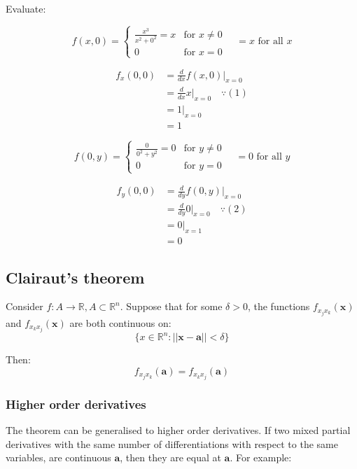 \documentclass[11pt]{article}
\begin{document}
Evaluate:

\[
f(x, 0) = \begin{cases}
\frac{x^3}{x^2 + 0^2} = x & \text{for } x \ne 0 \\
0 & \text{for } x = 0
\end{cases}
\quad = x \text{ for all } x \tag{1}
\]

\begin{align*}
f_x(0, 0) &= \frac{d}{dx} f(x, 0)|_{x = 0} \\
&= \frac{d}{dx}x|_{x = 0} \quad \because (1) \\
&= 1|_{x = 0} \\
&= 1
\end{align*}

\[
f(0, y) = \begin{cases}
\frac{0}{0^2 + y^2} = 0 & \text{for } y \ne 0 \\
0 & \text{for } y = 0
\end{cases}
\quad = 0 \text{ for all } y \tag{2}
\]

\begin{align*}
f_y(0, 0) &= \frac{d}{dy} f(0, y)|_{x = 0} \\
&= \frac{d}{dy}0|_{x = 0} \quad \because (2) \\
&= 0|_{x = 1} \\
&= 0
\end{align*}

\subsection{Clairaut's theorem}
\label{sec:org06ac5bc}
Consider \(f : A \rightarrow \mathbb{R}, A \subset \mathbb{R}^n\). Suppose that for some \(\delta > 0\), the functions \(f_{x_j x_k} (\boldsymbol{x})\) and \(f_{x_k x_j} (\boldsymbol{x})\) are both continuous on:
\[\{x \in \mathbb{R}^n : ||\boldsymbol{x} - \boldsymbol{a}|| < \delta\}\]

Then:
\[f_{x_j x_k} (\boldsymbol{a}) = f_{x_k x_j}(\boldsymbol{a})\]

\subsubsection{Higher order derivatives}
\label{sec:org53faba1}
The theorem can be generalised to higher order derivatives. If two mixed partial derivatives with the same number of differentiations with respect to the same variables, are continuous \(\boldsymbol{a}\), then they are equal at \(\boldsymbol{a}\). For example:
\end{document}
